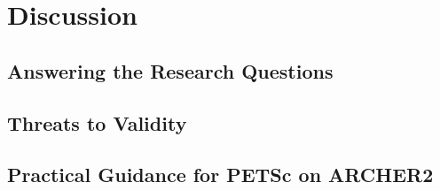 \chapter{Discussion}
\label{ch:discussion}

\section{Answering the Research Questions}
\label{sec:rqs}

\section{Threats to Validity}
\label{sec:threats}

\section{Practical Guidance for PETSc on ARCHER2}
\label{sec:guidance}
